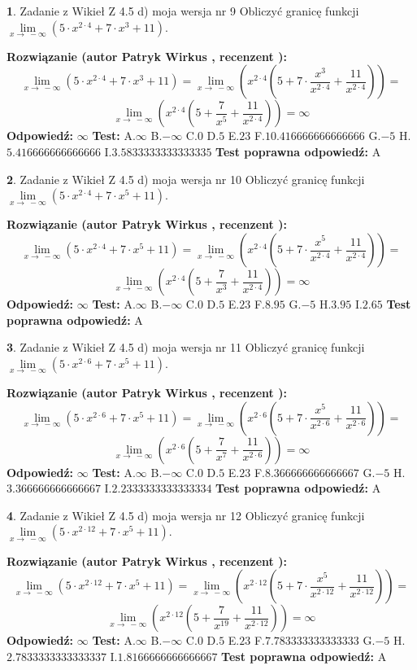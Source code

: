 \documentclass[12pt, a4paper]{article}
\theoremstyle{definition} %
\newtheorem{zad}{}
\newcommand{\zadStart}[1]{\begin{zad}#1\newline}
\newcommand{\zadStop}{\end{zad}}
\newcommand{\rozwStart}[2]{\noindent \textbf{Rozwiązanie (autor #1 , recenzent #2): }\newline}
\newcommand{\rozwStop}{\newline}
\newcommand{\odpStart}{\noindent \textbf{Odpowiedź:}\newline}
\newcommand{\odpStop}{\newline}
\newcommand{\testStart}{\noindent \textbf{Test:}\newline}
\newcommand{\testStop}{\newline}
\newcommand{\kluczStart}{\noindent \textbf{Test poprawna odpowiedź:}\newline}
\newcommand{\kluczStop}{\newline}
\begin{document}
\zadStart{Zadanie z Wikieł Z 4.5 d) moja wersja nr 9}
Obliczyć granicę funkcji  $\lim\limits_{x\to\ -\infty}(5 \cdot x^{2\cdot4}+7 \cdot x^{3}+11)$.
\zadStop
\rozwStart{Patryk Wirkus}{}
$$\lim\limits_{x\to\ -\infty}(5 \cdot x^{2\cdot4}+7 \cdot x^{3}+11) = \lim\limits_{x\to\ -\infty}(x^{2\cdot4}(5 +7 \cdot \frac{x^{3}}{x^{2\cdot4}}+\frac{11}{x^{2\cdot4}})) =$$ $$\lim\limits_{x\to\ -\infty}(x^{2\cdot4}(5 +\frac{7}{x^{5}}+\frac{11}{x^{2\cdot4}})) =\infty$$
\rozwStop
\odpStart
$\infty$
\odpStop
\testStart
A.$\infty$ B.$-\infty$ C.$0$ D.$5$ E.$23$
F.$10.416666666666666$ G.$-5$
H.$5.416666666666666$
I.$3.5833333333333335$
\testStop
\kluczStart
A
\kluczStop



\zadStart{Zadanie z Wikieł Z 4.5 d) moja wersja nr 10}
Obliczyć granicę funkcji  $\lim\limits_{x\to\ -\infty}(5 \cdot x^{2\cdot4}+7 \cdot x^{5}+11)$.
\zadStop
\rozwStart{Patryk Wirkus}{}
$$\lim\limits_{x\to\ -\infty}(5 \cdot x^{2\cdot4}+7 \cdot x^{5}+11) = \lim\limits_{x\to\ -\infty}(x^{2\cdot4}(5 +7 \cdot \frac{x^{5}}{x^{2\cdot4}}+\frac{11}{x^{2\cdot4}})) =$$ $$\lim\limits_{x\to\ -\infty}(x^{2\cdot4}(5 +\frac{7}{x^{3}}+\frac{11}{x^{2\cdot4}})) =\infty$$
\rozwStop
\odpStart
$\infty$
\odpStop
\testStart
A.$\infty$ B.$-\infty$ C.$0$ D.$5$ E.$23$
F.$8.95$ G.$-5$
H.$3.95$
I.$2.65$
\testStop
\kluczStart
A
\kluczStop



\zadStart{Zadanie z Wikieł Z 4.5 d) moja wersja nr 11}
Obliczyć granicę funkcji  $\lim\limits_{x\to\ -\infty}(5 \cdot x^{2\cdot6}+7 \cdot x^{5}+11)$.
\zadStop
\rozwStart{Patryk Wirkus}{}
$$\lim\limits_{x\to\ -\infty}(5 \cdot x^{2\cdot6}+7 \cdot x^{5}+11) = \lim\limits_{x\to\ -\infty}(x^{2\cdot6}(5 +7 \cdot \frac{x^{5}}{x^{2\cdot6}}+\frac{11}{x^{2\cdot6}})) =$$ $$\lim\limits_{x\to\ -\infty}(x^{2\cdot6}(5 +\frac{7}{x^{7}}+\frac{11}{x^{2\cdot6}})) =\infty$$
\rozwStop
\odpStart
$\infty$
\odpStop
\testStart
A.$\infty$ B.$-\infty$ C.$0$ D.$5$ E.$23$
F.$8.366666666666667$ G.$-5$
H.$3.366666666666667$
I.$2.2333333333333334$
\testStop
\kluczStart
A
\kluczStop



\zadStart{Zadanie z Wikieł Z 4.5 d) moja wersja nr 12}
Obliczyć granicę funkcji  $\lim\limits_{x\to\ -\infty}(5 \cdot x^{2\cdot12}+7 \cdot x^{5}+11)$.
\zadStop
\rozwStart{Patryk Wirkus}{}
$$\lim\limits_{x\to\ -\infty}(5 \cdot x^{2\cdot12}+7 \cdot x^{5}+11) = \lim\limits_{x\to\ -\infty}(x^{2\cdot12}(5 +7 \cdot \frac{x^{5}}{x^{2\cdot12}}+\frac{11}{x^{2\cdot12}})) =$$ $$\lim\limits_{x\to\ -\infty}(x^{2\cdot12}(5 +\frac{7}{x^{19}}+\frac{11}{x^{2\cdot12}})) =\infty$$
\rozwStop
\odpStart
$\infty$
\odpStop
\testStart
A.$\infty$ B.$-\infty$ C.$0$ D.$5$ E.$23$
F.$7.783333333333333$ G.$-5$
H.$2.7833333333333337$
I.$1.8166666666666667$
\testStop
\kluczStart
A
\kluczStop
\end{document}
